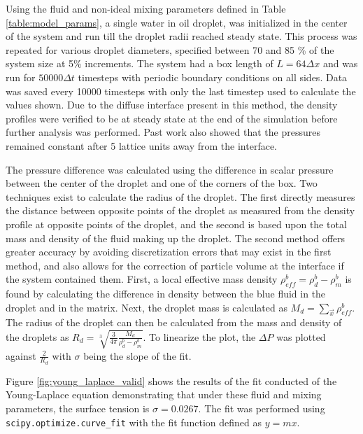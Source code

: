 Using the fluid and non-ideal mixing parameters defined in Table \ref{table:model_params}, a single water in oil 
droplet, was initialized in the center of the system and run till the droplet radii reached steady state. 
This process was repeated for various droplet diameters, specified between 70 and 85 \% of the system size at 5\% 
increments. The system had a box length of $L = 64 \Delta x$ and was run for $50000 \Delta t$ timesteps with periodic boundary conditions 
on all sides. Data was saved every 10000 timesteps with only the last timestep used to calculate the values shown. Due 
to the diffuse interface present in this method, the density profiles were verified to be at steady state at the end of 
the simulation before further analysis was performed. \cite{frijters_effects_2012} Past work also showed that the 
pressures remained constant after 5 lattice units away from the interface. \cite{frijters_effects_2012} 

The pressure difference was calculated using the difference in scalar pressure between the center of the droplet and 
one of the corners of the box. Two techniques exist to calculate the radius of the droplet. The first directly measures 
the distance between opposite points of the droplet as measured from the density profile at opposite points of the droplet, 
and the second is based upon the total mass and density of the fluid making up the droplet. The second method offers greater 
accuracy by avoiding discretization errors that may exist in the first method, and also allows for the correction of 
particle volume at the interface if the system contained them. First, a local effective mass density 
$\rho^b_{eff} = \rho^{b}_{d} - \rho^{b}_{m}$ is found by calculating the difference in density between the blue 
fluid in the droplet and in the matrix. Next, the droplet mass is calculated as $M_d = \sum_{\vec{x}}{\rho_{eff}^{b}}$. 
The radius of the droplet can then be calculated from the mass and density of the droplets as $R_d = \sqrt[3]{\frac{3}{4\pi} 
\frac{M_d}{\rho^b_d - \rho^b_m}}$. To linearize the plot, the $\Delta P$ was plotted against $\frac{2}{R_d}$ with 
$\sigma$ being the slope of the fit.

Figure \ref{fig:young_laplace_valid} shows the results of the fit conducted of the Young-Laplace equation demonstrating 
that under these fluid and mixing parameters, the surface tension is $\sigma = 0.0267$. The fit was performed using 
\texttt{scipy.optimize.curve\_fit} with the fit function defined as $y = mx$.